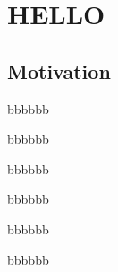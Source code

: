 \documentclass[10pt]{book}
\begin{document}
    \chapter{HELLO}


    \section{Motivation}
    \lipsum
    \begin{theorem}
    \end{theorem}

    \begin{corollary}
    \end{corollary}

    \begin{proposition}
        bbbbbb
    \end{proposition}

    \begin{conjecture}
        bbbbbb
    \end{conjecture}

    \begin{lemma}
        bbbbbb
    \end{lemma}

    \begin{definition}
        bbbbbb
    \end{definition}

    \begin{remark}
        bbbbbb
    \end{remark}

    \begin{assumption}
        bbbbbb
    \end{assumption}






    \cleardoublepage%
    \appendix
    \pagestyle{back} %
    \backmatter


    \printbibliography[category=cited]%
    \printbibliography[title={Further Reading},notcategory=cited]
    \nocite{*}


    \listoffigures

    \tableofcontents%
\end{document}
